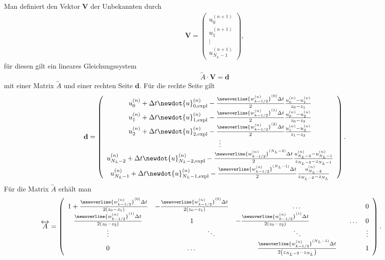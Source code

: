 %
Man definiert den Vektor $\mathbf{V}$ der Unbekannten durch
%
\begin{align}
\mathbf{V} = \left(\begin{array}{c}
u^{(n + 1)}_{0}\\
u^{(n + 1)}_{1}\\
\vdots\\
u^{(n + 1)}_{N_L - 1}
\end{array}\right),
\end{align}
%
für diesen gilt ein lineares Gleichungssystem
%
\begin{align}
\overleftrightarrow{A}\cdot\mathbf{V} = \mathbf{d}
\end{align}
%
mit einer Matrix $\overleftrightarrow{A}$ und einer rechten Seite $\mathbf{d}$. Für die rechte Seite gilt
%
\begin{align}
\mathbf{d} = \left(\begin{array}{c}
u^{(n)}_{0} + \Delta t\newdot{u}^{(n)}_{0, \text{expl}} - \frac{\newoverline{w^{(n)}_{k - 1/2}}^{(0)}\Delta t}{2}\frac{u^{(n)}_{0} - u^{(n)}_{1}}{z_{0} - z_{1}}\\
u^{(n)}_{1} + \Delta t\newdot{u}^{(n)}_{1, \text{expl}} - \frac{\newoverline{w^{(n)}_{k - 1/2}}^{(1)}\Delta t}{2}\frac{u^{(n)}_{0} - u^{(n)}_{2}}{z_{0} - z_{2}}\\
u^{(n)}_{2} + \Delta t\newdot{u}^{(n)}_{2, \text{expl}} - \frac{\newoverline{w^{(n)}_{k - 1/2}}^{(2)}\Delta t}{2}\frac{u^{(n)}_{1} - u^{(n)}_{3}}{z_{1} - z_{3}}\\
\vdots\\
u^{(n)}_{N_L - 2} + \Delta t\newdot{u}^{(n)}_{N_L - 2, \text{expl}} - \frac{\newoverline{w^{(n)}_{k - 1/2}}^{(N_L - 2)}\Delta t}{2}\frac{u^{(n)}_{N_L - 3} - u^{(n)}_{N_L - 1}}{z_{N_L - 3} - z_{N_L - 1}}\\
u^{(n)}_{N_L - 1} + \Delta t\newdot{u}^{(n)}_{N_L - 1, \text{expl}} - \frac{\newoverline{w^{(n)}_{k - 1/2}}^{(N_L - 1)}\Delta t}{2}\frac{u^{(n)}_{N_L - 2}}{z_{N_L - 2} - z_{N_L}}
\end{array}\right).
\end{align}
%
Für die Matrix $\overleftrightarrow{A}$ erhält man
%
\begin{align}
\overleftrightarrow{A} &= \left(\begin{array}{cccc}
1 + \frac{\newoverline{w^{(n)}_{k - 1/2}}^{(0)}\Delta t}{2\left(z_{0} - z_{1}\right)} & -\frac{\newoverline{w^{(n)}_{k - 1/2}}^{(0)}\Delta t}{2\left(z_{0} - z_{1}\right)}  & \dots & 0 \\
\frac{\newoverline{w^{(n)}_{k - 1/2}}^{(1)}\Delta t}{2\left(z_{0} - z_{2}\right)} & 1 & -\frac{\newoverline{w^{(n)}_{k - 1/2}}^{(1)}\Delta t}{2\left(z_{0} - z_{2}\right)}\hspace{2 cm}\dots &  0 \\
\vdots & \hspace{2 cm}\ddots & \ddots & \vdots \\
0 & \dots & \frac{\newoverline{w^{(n)}_{k - 1/2}}^{(N_L - 1)}\Delta t}{2\left(z_{N_L - 2} - z_{N_L}\right)} & 1
\end{array}\right).
\end{align}

